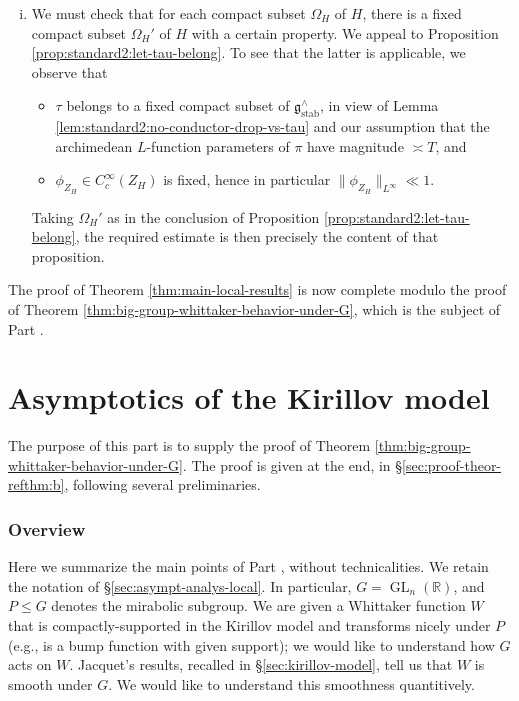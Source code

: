 \documentclass[reqno]{amsart}
\DeclareMathOperator{\GL}{GL}
\DeclareMathOperator{\stab}{stab}
\theoremstyle{plain} \newtheorem{theorem} {Theorem}
\theoremstyle{definition} \newtheorem{definition} [theorem] {Definition}
\theoremstyle{itplain} %
\numberwithin{equation}{section}
\numberwithin{theorem}{section}
\renewcommand{\leq}{\leqslant}
\begin{document}
\begin{enumerate}[(i)]
\item We must check that for each compact subset $\Omega_H$ of $H$, there is a fixed compact subset $\Omega_H'$ of $H$ with a certain property.  We appeal to Proposition \ref{prop:standard2:let-tau-belong}.  To see that the latter is applicable, we observe that
  \begin{itemize}
  \item $\tau$ belongs to a fixed compact subset of $\mathfrak{g}^\wedge_{\stab}$, in view of Lemma \ref{lem:standard2:no-conductor-drop-vs-tau} and our assumption that the archimedean $L$-function parameters of $\pi$ have magnitude $\asymp T$, and
  \item $\phi_{Z_H} \in C_c^\infty(Z_H)$ is fixed, hence in particular  $\|\phi_{Z_H}\|_{L^\infty} \ll 1$.
  \end{itemize}
  Taking $\Omega_H'$ as in the conclusion of Proposition \ref{prop:standard2:let-tau-belong}, the required estimate is then precisely the content of that proposition.
\end{enumerate}

The proof of Theorem  \ref{thm:main-local-results} is now complete modulo the proof of Theorem \ref{thm:big-group-whittaker-behavior-under-G}, which is the subject of Part \ref{part:asympt-analys-kirill}.


\part{Asymptotics of the Kirillov model}\label{part:asympt-analys-kirill}
The purpose of this part is to supply the proof of Theorem \ref{thm:big-group-whittaker-behavior-under-G}.  The proof is given at the end, in \S\ref{sec:proof-theor-refthm:b}, following several preliminaries.



\section{Overview}\label{sec:overview-asymp-kirillov}
Here we summarize the main points of Part \ref{part:asympt-analys-kirill}, without technicalities.  We retain the notation of \S\ref{sec:asympt-analys-local}.  In particular, $G = \GL_n(\mathbb{R})$, and $P \leq G$ denotes the mirabolic subgroup.  We are given a Whittaker function $W$ that is compactly-supported in the Kirillov model and transforms nicely under $P$ (e.g., is a bump function with given support); we would like to understand how $G$ acts on $W$.  Jacquet's results, recalled in \S\ref{sec:kirillov-model}, tell us that $W$ is smooth under $G$. We would like to understand this smoothness quantitively.
\end{document}
